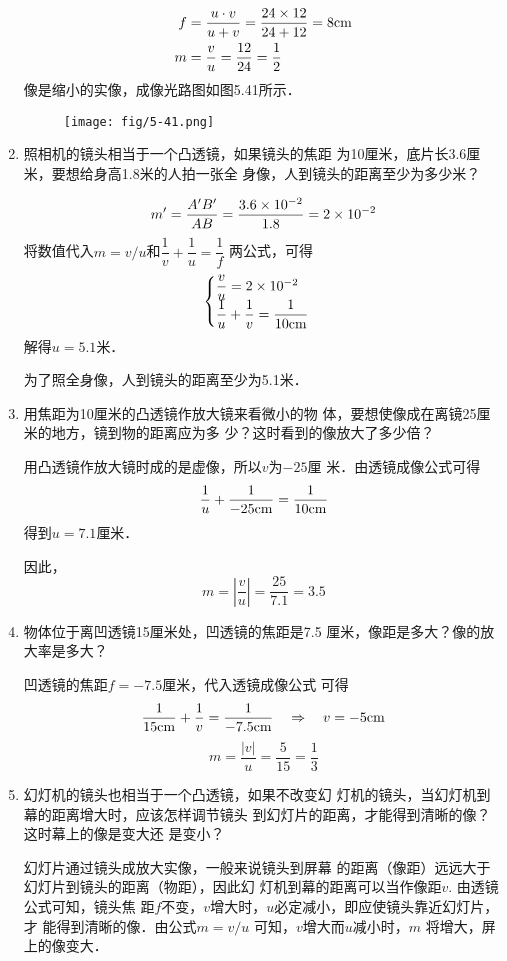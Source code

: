 \begin{enumerate}
\begin{solution}
\[\begin{split}
    f&=\frac{u\cdot v}{u+v}=\frac{24\times 12}{24+12}=8{\rm cm}\\
    m&=\frac{v}{u}=\frac{12}{24}=\frac{1}{2}
\end{split}\]
像是缩小的实像，成像光路图如图5.41所示．
\begin{figure}[htp]
    \centering
    \texttt{[image: fig/5-41.png]}
    \caption{}
\end{figure}
\end{solution}
\item 照相机的镜头相当于一个凸透镜，如果镜头的焦距
为10厘米，底片长3.6厘米，要想给身高1.8米的人拍一张全
身像，人到镜头的距离至少为多少米？

\begin{solution}
\[m'=\frac{A'B'}{AB}=\frac{3.6\times 10^{-2}}{1.8}=2\times 10^{-2}\]
将数值代入$m=v/u$和$\dfrac{1}{v}+\dfrac{1}{u}=\dfrac{1}{f}$
两公式，可得
\[\begin{cases}
    \dfrac{v}{u}=2\times 10^{-2}\\
    \dfrac{1}{u}+\dfrac{1}{v}=\dfrac{1}{10{\rm cm}}
\end{cases}\]
解得$u=5.1$米．

为了照全身像，人到镜头的距离至少为5.1米．
\end{solution}
\item 用焦距为10厘米的凸透镜作放大镜来看微小的物
体，要想使像成在离镜25厘米的地方，镜到物的距离应为多
少？这时看到的像放大了多少倍？

\begin{solution}
用凸透镜作放大镜时成的是虚像，所以$v$为$-25$厘
米．由透镜成像公式可得
\[\frac{1}{u}+\frac{1}{-25{\rm cm}}=\frac{1}{10{\rm cm}}\]
得到$u=7.1$厘米．

因此，
\[m=\left|\frac{v}{u}\right|=\frac{25}{7.1}=3.5\]
\end{solution}
\item 物体位于离凹透镜15厘米处，凹透镜的焦距是7.5
厘米，像距是多大？像的放大率是多大？

\begin{solution}
    凹透镜的焦距$f=-7.5$厘米，代入透镜成像公式
    可得
\[\frac{1}{15{\rm cm}}+\frac{1}{v}=\frac{1}{-7.5{\rm cm}}\quad \Rightarrow\quad v=-5{\rm cm}\]
\[m=\frac{|v|}{u}=\frac{5}{15}=\frac{1}{3}\]
\end{solution}
\item 幻灯机的镜头也相当于一个凸透镜，如果不改变幻
灯机的镜头，当幻灯机到幕的距离增大时，应该怎样调节镜头
到幻灯片的距离，才能得到清晰的像？这时幕上的像是变大还
是变小？

\begin{solution}
    幻灯片通过镜头成放大实像，一般来说镜头到屏幕
    的距离（像距）远远大于幻灯片到镜头的距离（物距），因此幻
    灯机到幕的距离可以当作像距$v$. 由透镜公式可知，镜头焦
    距$f$不变，$v$增大时，$u$必定减小，即应使镜头靠近幻灯片，才
    能得到清晰的像．由公式$m=v/u$
    可知，$v$增大而$u$减小时，$m$
    将增大，屏上的像变大．
\end{solution}
\end{enumerate}





